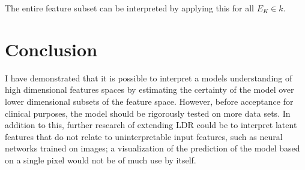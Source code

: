 \documentclass[a4paper, twocolumn]{article}
\begin{document}
The entire feature subset can be interpreted by applying this for all $E_K \in k$.

\section{Conclusion}\label{Conclusion}

I have demonstrated that it is possible to interpret a models understanding of high dimensional features spaces by estimating the certainty of the model over lower dimensional subsets of the feature space. However, before acceptance for clinical purposes, the model should be rigorously tested on more data sets. In addition to this, further research of extending LDR could be to interpret latent features that do not relate to uninterpretable input features, such as neural networks trained on images; a visualization of the prediction of the model based on a single pixel would not be of much use by itself.

\printbibliography
\end{document}
